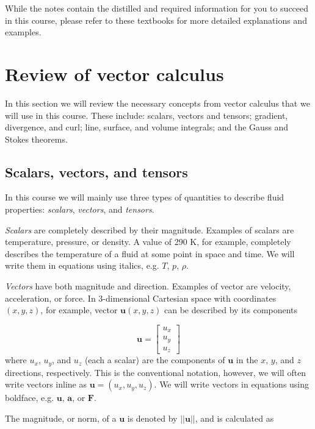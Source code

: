 \documentclass[12pt]{article}
\numberwithin{equation}{section}
\numberwithin{figure}{section}
\numberwithin{table}{section}
\begin{document}
While the notes contain the distilled and required information for you to
succeed in this course, please refer to these textbooks for more detailed
explanations and examples.

\newpage
\section{Review of vector calculus}

In this section we will review the necessary concepts from vector calculus that
we will use in this course.
These include:
scalars, vectors and tensors;
gradient, divergence, and curl;
line, surface, and volume integrals;
and the Gauss and Stokes theorems.

\subsection{Scalars, vectors, and tensors}

In this course we will mainly use three types of quantities to describe fluid
properties: \textit{scalars}, \textit{vectors}, and \textit{tensors}.

\textit{Scalars} are completely described by their magnitude.
Examples of scalars are temperature, pressure, or density.
A value of 290 K, for example, completely describes the temperature of a fluid
at some point in space and time.
We will write them in equations using italics, e.g. $T$, $p$, $\rho$.

\textit{Vectors} have both magnitude and direction.
Examples of vector are velocity, acceleration, or force.
In 3-dimensional Cartesian space with coordinates $(x, y, z)$, for example,
vector $\mathbf{u}(x,y,z)$ can be described by its components

\begin{equation}
  \mathbf{u} =
  \begin{bmatrix}
    u_x \\
    u_y \\
    u_z
  \end{bmatrix}
\end{equation}
where $u_x$, $u_y$, and $u_z$ (each a scalar) are the components of $\mathbf{u}$
in the $x$, $y$, and $z$ directions, respectively.
This is the conventional notation, however, we will often write vectors
inline as $\mathbf{u} = (u_x, u_y, u_z)$.
We will write vectors in equations using boldface, e.g. $\mathbf{u}$,
$\mathbf{a}$, or $\mathbf{F}$.

The magnitude, or norm, of a 
$\mathbf{u}$ is denoted by $||\mathbf{u}||$, and is calculated as
\end{document}
